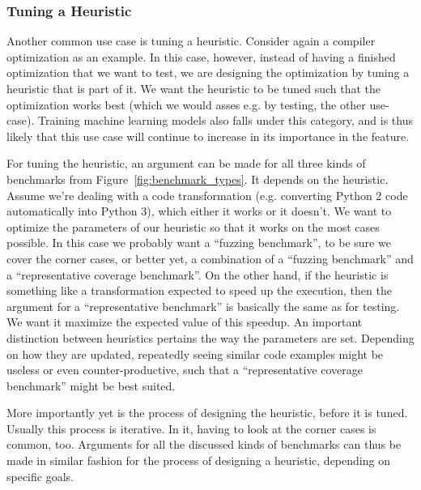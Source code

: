 \subsubsection{Tuning a Heuristic}
\label{sec:tuning}

Another common use case is tuning a heuristic. Consider again a compiler optimization as an example. In this case, however, instead of having a finished optimization that we want to test, we are designing the optimization by tuning a heuristic that is part of it.
We want the heuristic to be tuned such that the optimization works best (which we would asses e.g. by testing, the other use-case).
Training machine learning models also falls under this category, and is thus likely that this use case will continue to increase in its importance in the feature.

For tuning the heuristic, an argument can be made for all three kinds of benchmarks from Figure~\ref{fig:benchmark_types}. It depends on the heuristic.
Assume we're dealing with a code transformation (e.g. converting Python 2 code automatically into Python 3),  which either it works or it doesn't. We want to optimize the parameters of our heuristic so that it works on the most cases possible.
In this case we probably want a ``fuzzing benchmark'', to be sure we cover the corner cases, or better yet, a combination of a ``fuzzing benchmark'' and a ``representative coverage benchmark''.
On the other hand, if the heuristic is something like a transformation expected to speed up the execution, then the argument for a ``representative benchmark'' is basically the same as for testing.
We want it maximize the expected value of this speedup.
An important distinction between heuristics pertains the way the parameters are set. Depending on how they are updated, repeatedly seeing similar code examples might be useless or even counter-productive, such that a ``representative coverage benchmark'' might be best suited.

More importantly yet is the process of designing the heuristic, before it is tuned. Usually this process is iterative. In it, having to look at the corner cases is common, too.
Arguments for all the discussed kinds of benchmarks can thus be made in similar fashion for the process of designing a heuristic, depending on specific goals.

